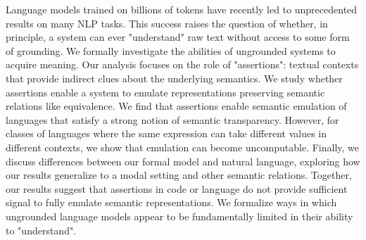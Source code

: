 Language models trained on billions of tokens have recently led to unprecedented results on many NLP tasks. This success raises the question of whether, in principle, a system can ever "understand" raw text without access to some form of grounding. We formally investigate the abilities of ungrounded systems to acquire meaning. Our analysis focuses on the role of "assertions": textual contexts that provide indirect clues about the underlying semantics. We study whether assertions enable a system to emulate representations preserving semantic relations like equivalence. We find that assertions enable semantic emulation of languages that satisfy a strong notion of semantic transparency. However, for classes of languages where the same expression can take different values in different contexts, we show that emulation can become uncomputable. Finally, we discuss differences between our formal model and natural language, exploring how our results generalize to a modal setting and other semantic relations. Together, our results suggest that assertions in code or language do not provide sufficient signal to fully emulate semantic representations. We formalize ways in which ungrounded language models appear to be fundamentally limited in their ability to "understand".